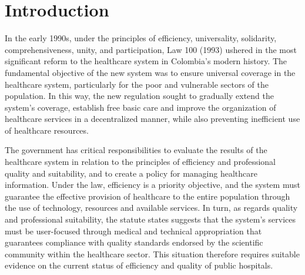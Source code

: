 \documentclass[11pt,a4paper,oneside]{article}
\begin{document}
\newpage
\clearpage



% 



\section{Introduction}
\label{sec:intro}


In the early 1990s, under the principles of efficiency, universality, solidarity, comprehensiveness, unity, and participation, Law 100 (1993) ushered in the most significant reform to the healthcare system in Colombia's modern history. The fundamental objective of the new system was to ensure universal coverage in the healthcare system, particularly for the poor and vulnerable sectors of the population. In this way, the new regulation sought to gradually extend the system's coverage, establish free basic care and improve the organization of healthcare services in a decentralized manner, while also preventing inefficient use of healthcare resources.


The government has critical responsibilities to evaluate the results of the healthcare system in relation to the principles of efficiency and professional quality and suitability, and to create a policy for managing healthcare information. Under the law, efficiency is a priority objective, and the system must guarantee the effective provision of healthcare to the entire population through the use of technology, resources and available services. In turn, as regards quality and professional suitability, the statute states suggests that the system's services must be user-focused through medical and technical appropriation that guarantees compliance with quality standards endorsed by the scientific community within the healthcare sector. This situation therefore requires suitable evidence on the current status of efficiency and quality of public hospitals.
\end{document}
